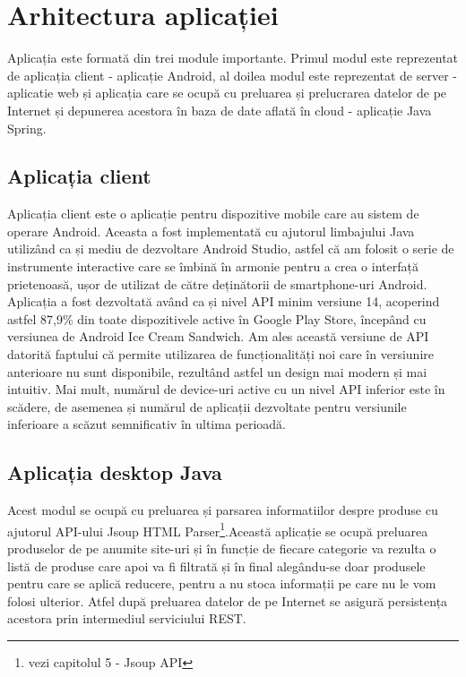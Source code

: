 \chapter{Arhitectura aplicației}
Aplicația este formată din trei module importante. 
Primul modul este reprezentat de aplicația client - aplicație Android, al doilea modul este reprezentat de server - aplicatie web și aplicația care se ocupă cu preluarea și prelucrarea datelor de pe Internet și depunerea acestora în baza de date aflată în cloud - aplicație Java Spring.
\section{Aplicația client}
Aplicația client este o aplicație pentru dispozitive mobile care au sistem de operare Android. Aceasta a fost implementată cu ajutorul limbajului Java utilizând ca și mediu de dezvoltare Android Studio, astfel că am folosit o serie de instrumente interactive care se îmbină în armonie pentru a crea o interfață prietenoasă, ușor de utilizat de către deținătorii de smartphone-uri Android. 
Aplicația a fost dezvoltată având ca și nivel API minim versiune 14, acoperind astfel 87,9\% din toate dispozitivele active în Google Play Store, începând cu versiunea de Android Ice Cream Sandwich. Am ales această versiune de API datorită faptului că permite utilizarea de funcționalități noi care în versiunire anterioare nu sunt disponibile, rezultând astfel un design mai modern și mai intuitiv. Mai mult, numărul de device-uri active cu un nivel API inferior este în scădere, de asemenea și numărul de aplicații dezvoltate pentru versiunile inferioare a scăzut semnificativ în ultima perioadă.
\section{Aplicația desktop Java}
Acest modul se ocupă cu preluarea și parsarea informatiilor despre produse cu ajutorul API-ului Jsoup HTML Parser\footnote{vezi capitolul 5 - Jsoup API}.\newpage Această aplicație se ocupă preluarea produselor de pe anumite site-uri și în funcție de fiecare categorie va rezulta o listă de produse care apoi va fi filtrată și în final alegându-se doar produsele pentru care se aplică reducere, pentru a nu stoca informații pe care nu le vom folosi ulterior. Atfel după preluarea datelor de pe Internet se asigură persistența acestora prin intermediul serviciului REST. 
